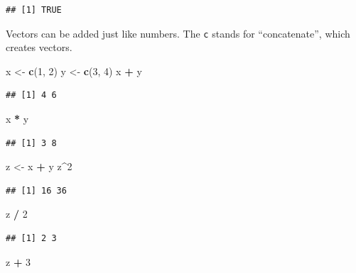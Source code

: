 \documentclass[openany]{book}
\newenvironment{Shaded}{\begin{snugshade}}{\end{snugshade}}
\newcommand{\DecValTok}[1]{\textcolor[rgb]{0.00,0.00,0.81}{#1}}
\newcommand{\KeywordTok}[1]{\textcolor[rgb]{0.13,0.29,0.53}{\textbf{#1}}}
\newcommand{\NormalTok}[1]{#1}
\newcommand{\OperatorTok}[1]{\textcolor[rgb]{0.81,0.36,0.00}{\textbf{#1}}}
\newcommand{\StringTok}[1]{\textcolor[rgb]{0.31,0.60,0.02}{#1}}
\begin{document}
\begin{verbatim}
## [1] TRUE
\end{verbatim}

Vectors can be added just like numbers. The \texttt{c} stands for ``concatenate'', which
creates vectors.

\begin{Shaded}
\begin{Highlighting}[]
\NormalTok{x <-}\StringTok{ }\KeywordTok{c}\NormalTok{(}\DecValTok{1}\NormalTok{, }\DecValTok{2}\NormalTok{)}
\NormalTok{y <-}\StringTok{ }\KeywordTok{c}\NormalTok{(}\DecValTok{3}\NormalTok{, }\DecValTok{4}\NormalTok{)}
\NormalTok{x }\OperatorTok{+}\StringTok{ }\NormalTok{y}
\end{Highlighting}
\end{Shaded}

\begin{verbatim}
## [1] 4 6
\end{verbatim}

\begin{Shaded}
\begin{Highlighting}[]
\NormalTok{x }\OperatorTok{*}\StringTok{ }\NormalTok{y}
\end{Highlighting}
\end{Shaded}

\begin{verbatim}
## [1] 3 8
\end{verbatim}

\begin{Shaded}
\begin{Highlighting}[]
\NormalTok{z <-}\StringTok{ }\NormalTok{x }\OperatorTok{+}\StringTok{ }\NormalTok{y}
\NormalTok{z}\OperatorTok{^}\DecValTok{2}
\end{Highlighting}
\end{Shaded}

\begin{verbatim}
## [1] 16 36
\end{verbatim}

\begin{Shaded}
\begin{Highlighting}[]
\NormalTok{z }\OperatorTok{/}\StringTok{ }\DecValTok{2}
\end{Highlighting}
\end{Shaded}

\begin{verbatim}
## [1] 2 3
\end{verbatim}

\begin{Shaded}
\begin{Highlighting}[]
\NormalTok{z }\OperatorTok{+}\StringTok{ }\DecValTok{3}
\end{Highlighting}
\end{Shaded}
\end{document}
